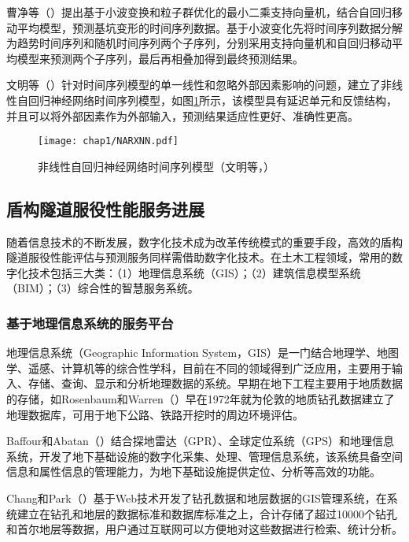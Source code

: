 曹净等（\citeyear{曹净2014基于}）提出基于小波变换和粒子群优化的最小二乘支持向量机，结合自回归移动平均模型，预测基坑变形的时间序列数据。基于小波变化先将时间序列数据分解为趋势时间序列和随机时间序列两个子序列，分别采用支持向量机和自回归移动平均模型来预测两个子序列，最后再相叠加得到最终预测结果。

文明等（\citeyear{文明2015地铁车站施工过程中地表沉降的}）针对时间序列模型的单一线性和忽略外部因素影响的问题，建立了非线性自回归神经网络时间序列模型，如图\ref{fig:非线性自回归神经网络}所示，该模型具有延迟单元和反馈结构，并且可以将外部因素作为外部输入，预测结果适应性更好、准确性更高。

\begin{figure}[!h]
	\centering
	\texttt{[image: chap1/NARXNN.pdf]}
	\caption{非线性自回归神经网络时间序列模型（文明等，\citeyear{文明2015地铁车站施工过程中地表沉降的}）}
	\label{fig:非线性自回归神经网络}
\end{figure}

\subsection{盾构隧道服役性能服务进展}
\label{chap:service-intro}

随着信息技术的不断发展，数字化技术成为改革传统模式的重要手段，高效的盾构隧道服役性能评估与预测服务同样需借助数字化技术。在土木工程领域，常用的数字化技术包括三大类：（1）地理信息系统（GIS）；（2）建筑信息模型系统（BIM）；（3）综合性的智慧服务系统。

\subsubsection{基于地理信息系统的服务平台}

地理信息系统（Geographic Information System，GIS）是一门结合地理学、地图学、遥感、计算机等的综合性学科，目前在不同的领域得到广泛应用，主要用于输入、存储、查询、显示和分析地理数据的系统。早期在地下工程主要用于地质数据的存储，如Rosenbaum和Warren（\citeyear{rosenbaum1986creating}）早在1972年就为伦敦的地质钻孔数据建立了地理数据库，可用于地下公路、铁路开挖时的周边环境评估。

Baffour和Abatan（\citeyear{baffour2002developing}）结合探地雷达（GPR）、全球定位系统（GPS）和地理信息系统，开发了地下基础设施的数字化采集、处理、管理信息系统，该系统具备空间信息和属性信息的管理能力，为地下基础设施提供定位、分析等高效的功能。

Chang和Park（\citeyear{chang2004development}）基于Web技术开发了钻孔数据和地层数据的GIS管理系统，在系统建立在钻孔和地层的数据标准和数据库标准之上，合计存储了超过10000个钻孔和首尔地层等数据，用户通过互联网可以方便地对这些数据进行检索、统计分析。

